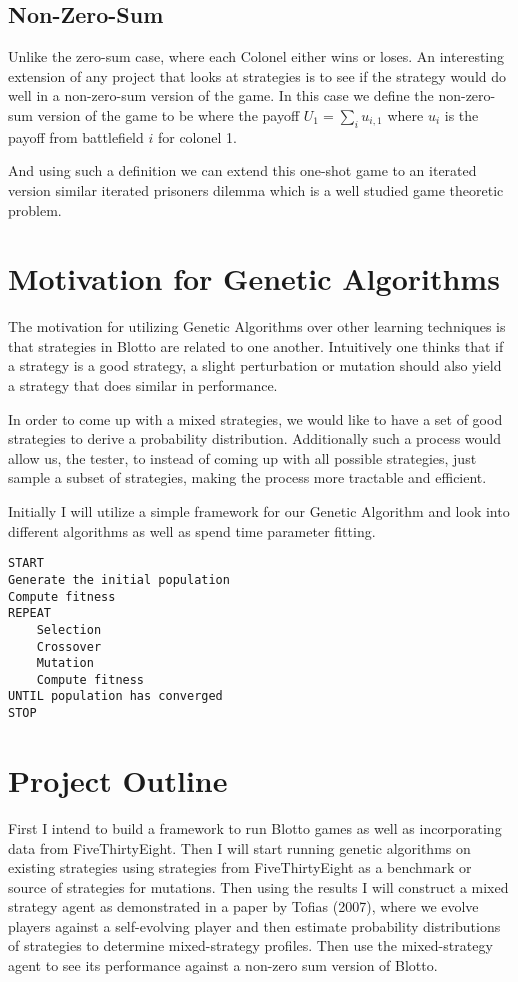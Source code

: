 \documentclass[11pt,letter]{article}
\begin{document}
\subsection{Non-Zero-Sum}
Unlike the zero-sum case, where each Colonel either wins or loses. An interesting extension of any project that looks at strategies is to see if the strategy would do well in a non-zero-sum version of the game. In this case we define the non-zero-sum version of the game to be where the payoff $U_1 = \sum_i u_{i, 1}$ where $u_i$ is the payoff from battlefield $i$ for colonel 1.

And using such a definition we can extend this one-shot game to an iterated version similar iterated prisoners dilemma which is a well studied game theoretic problem.

\section{Motivation for Genetic Algorithms} %
The motivation for utilizing Genetic Algorithms over other learning techniques is that strategies in Blotto are related to one another. Intuitively one thinks that if a strategy is a good strategy, a slight perturbation or mutation should also yield a strategy that does similar in performance.

In order to come up with a mixed strategies, we would like to have a set of good strategies to derive a probability distribution. Additionally such a process would allow us, the tester, to instead of coming up with all possible strategies, just sample a subset of strategies, making the process more tractable and efficient.

Initially I will utilize a simple framework for our Genetic Algorithm and look into different algorithms as well as spend time parameter fitting.
\begin{lstlisting}[mathescape, tabsize=4, basicstyle=\fontfamily{lmvtt}\selectfont,]
START
Generate the initial population
Compute fitness
REPEAT
    Selection
    Crossover
    Mutation
    Compute fitness
UNTIL population has converged
STOP
\end{lstlisting}
\section{Project Outline} %
First I intend to build a framework to run Blotto games as well as incorporating data from FiveThirtyEight. Then I will start running genetic algorithms on existing strategies using strategies from FiveThirtyEight as a benchmark or source of strategies for mutations. Then using the results I will construct a mixed strategy agent as demonstrated in a paper by Tofias (2007), where we evolve players against a self-evolving player and then estimate probability distributions of strategies to determine mixed-strategy profiles. Then use the mixed-strategy agent to see its performance against a non-zero sum version of Blotto. 
\end{document}
